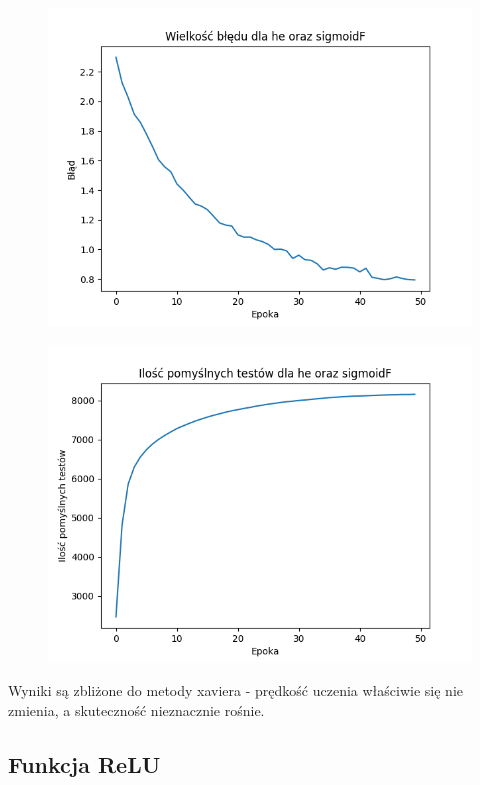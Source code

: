 \documentclass{article}
\begin{document}
\newpage
\begin{figure}[!htb]
  \centering
  \includegraphics[width=\linewidth]{error_he_sigmoidF.png}
\end{figure}

\begin{figure}[!htb]
  \centering
  \includegraphics[width=\linewidth]{test_he_sigmoidF.png}
\end{figure}

Wyniki są zbliżone do metody xaviera - prędkość uczenia właściwie się nie zmienia, a skuteczność nieznacznie rośnie.

\newpage
\subsection{Funkcja ReLU}
\end{document}
